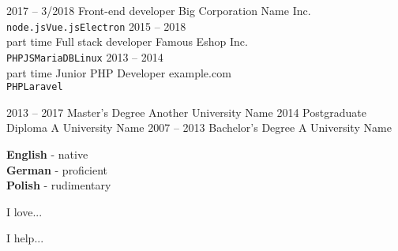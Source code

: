 \documentclass[9pt]{../template/developercv}
\begin{document}
\begin{center}
\end{center}



\begin{entrylist}
    \entry
        {2017 -- 3/2018}
        {Front-end developer}
        {Big Corporation Name Inc.}
        {\lorem \lorem \lorem\\ \texttt{node.js}\slashsep\texttt{Vue.js}\slashsep\texttt{Electron}}
    \entry
        {2015 -- 2018\\\footnotesize{part time}}
        {Full stack developer}
        {Famous Eshop Inc.}
        {\lorem\lorem\\ \texttt{PHP}\slashsep\texttt{JS}\slashsep\texttt{MariaDB}\slashsep\texttt{Linux}}
    \entry
        {2013 -- 2014\\\footnotesize{part time}}
        {Junior PHP Developer}
        {example.com}
        {\lorem\lorem\\ \texttt{PHP}\slashsep\texttt{Laravel}}
\end{entrylist}



\begin{entrylist}
    \entry
        {2013 -- 2017}
        {Master's Degree}
        {Another University Name}
        {\lorem\lorem\lorem}
    \entry
        {2014}
        {Postgraduate Diploma}
        {A University Name}
        {\lorem\lorem}
    \entry
        {2007 -- 2013}
        {Bachelor's Degree}
        {A University Name}
        {\lorem\lorem}
\end{entrylist}


\begin{minipage}[t]{0.3\textwidth}
    \vspace{-\baselineskip}
    \textbf{English} - native\\
    \textbf{German} - proficient\\
    \textbf{Polish} - rudimentary
\end{minipage}
%
\hfill
\begin{minipage}[t]{0.3\textwidth}
    \vspace{-\baselineskip}
    I love... \lorem
\end{minipage}
%
\hfill
\begin{minipage}[t]{0.3\textwidth}
    \vspace{-\baselineskip}
    I help... \lorem
\end{minipage}
\end{document}
